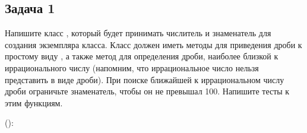 \documentclass[letterpaper,10pt,russian]{sphinxmanual}
\begin{document}
\subsection{Задача 1}
\label{\detokenize{educational_materials/testing/exercises:id2}}
\sphinxAtStartPar
Напишите класс , который будет принимать числитель и знаменатель для создания экземпляра класса. Класс должен иметь методы для приведения дроби к простому виду , а также метод для определения дроби, наиболее близкой к иррационального числу (напомним, что иррациональное число нельзя представить в виде дроби). При поиске ближайшей к иррациональном числу дроби ограничьте знаменатель, чтобы он не превышал 100. Напишите тесты к этим функциям.

\sphinxAtStartPar
{}

\sphinxAtStartPar
():
\end{document}
